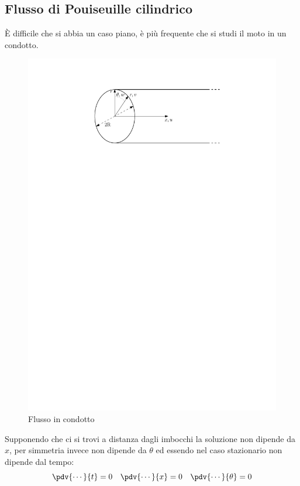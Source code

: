 \subsection{Flusso di Pouiseuille cilindrico}
È difficile che si abbia un caso piano, è più frequente che si studi il moto in un condotto.
%
	\begin{figure}[ht]
		\includegraphics[scale=1.0]{./3.6 Soluzioni esatte equazioni di Navier-Stokes/3.6-3}
		\centering
		\caption{Flusso in condotto}
	\end{figure}
%
Supponendo che ci si trovi a distanza dagli imbocchi la soluzione non dipende da $x$, per simmetria invece non dipende da $\theta$ ed essendo nel caso stazionario non dipende dal tempo:
%
	\begin{equation*}
		\pdv{\cdots}{t} = 0 \quad \pdv{\cdots}{x} = 0 \quad \pdv{\cdots}{\theta} = 0
	\end{equation*}
%

